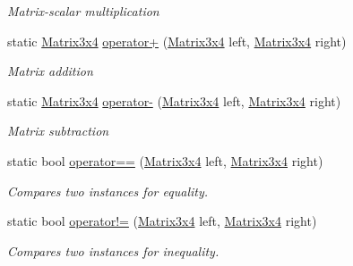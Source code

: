 \begin{DoxyCompactItemize}
\begin{DoxyCompactList}\small\item\em Matrix-\/scalar multiplication \end{DoxyCompactList}\item 
static \hyperlink{struct_open_t_k_1_1_matrix3x4}{Matrix3x4} \hyperlink{struct_open_t_k_1_1_matrix3x4_a8056b64e78a27effe7fb2f604531af53}{operator+} (\hyperlink{struct_open_t_k_1_1_matrix3x4}{Matrix3x4} left, \hyperlink{struct_open_t_k_1_1_matrix3x4}{Matrix3x4} right)
\begin{DoxyCompactList}\small\item\em Matrix addition \end{DoxyCompactList}\item 
static \hyperlink{struct_open_t_k_1_1_matrix3x4}{Matrix3x4} \hyperlink{struct_open_t_k_1_1_matrix3x4_a068b4cf9e225285d9c123477dcfc6cdf}{operator-\/} (\hyperlink{struct_open_t_k_1_1_matrix3x4}{Matrix3x4} left, \hyperlink{struct_open_t_k_1_1_matrix3x4}{Matrix3x4} right)
\begin{DoxyCompactList}\small\item\em Matrix subtraction \end{DoxyCompactList}\item 
static bool \hyperlink{struct_open_t_k_1_1_matrix3x4_a256ff07d2e66b05070ca1a0b48afbca3}{operator==} (\hyperlink{struct_open_t_k_1_1_matrix3x4}{Matrix3x4} left, \hyperlink{struct_open_t_k_1_1_matrix3x4}{Matrix3x4} right)
\begin{DoxyCompactList}\small\item\em Compares two instances for equality. \end{DoxyCompactList}\item 
static bool \hyperlink{struct_open_t_k_1_1_matrix3x4_ae4f688a74e90ee659a45694ba94137d0}{operator!=} (\hyperlink{struct_open_t_k_1_1_matrix3x4}{Matrix3x4} left, \hyperlink{struct_open_t_k_1_1_matrix3x4}{Matrix3x4} right)
\begin{DoxyCompactList}\small\item\em Compares two instances for inequality. \end{DoxyCompactList}\end{DoxyCompactItemize}
